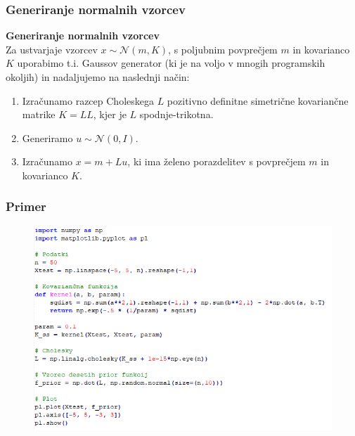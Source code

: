 \documentclass{beamer}
\begin{document}
\begin{frame}
\frametitle{Generiranje normalnih vzorcev}
\textbf{Generiranje normalnih vzorcev} \\
Za ustvarjaje vzorcev $ x \sim \mathcal{N}(m,K) $, s poljubnim povprečjem $m$ in kovarianco $K$ uporabimo t.i. Gaussov generator (ki je na voljo v mnogih programskih okoljih) in nadaljujemo na naslednji način: 
\begin{enumerate}
\item Izračunamo razcep Choleskega $L$ pozitivno definitne simetrične kovariančne matrike $K=LL$, kjer je $L$ spodnje-trikotna. 
\item Generiramo $ u \sim \mathcal{N}(0,I). $
\item Izračunamo $x= m+ Lu$, ki ima želeno porazdelitev s povprečjem $m$ in kovarianco $K$. 
\end{enumerate}


\end{frame}

\begin{frame}
\frametitle{Primer}
\begin{figure}[h]
\centering
\includegraphics[width=1\textwidth]{python1}
\end{figure}

\end{frame}
\end{document}
